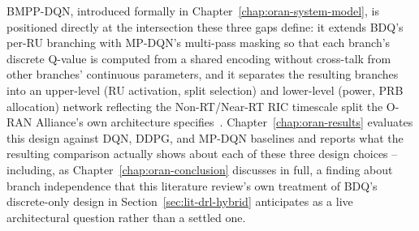 BMPP-DQN, introduced formally in Chapter~\ref{chap:oran-system-model},
is positioned directly at the intersection these three gaps define: it
extends BDQ's per-RU branching with MP-DQN's multi-pass masking so that each
branch's discrete Q-value is computed from a shared encoding without
cross-talk from other branches' continuous parameters, and it separates the
resulting branches into an upper-level (RU activation, split selection) and
lower-level (power, PRB allocation) network reflecting the Non-RT/Near-RT
RIC timescale split the O-RAN Alliance's own architecture
specifies~\cite{oran2021mvp}. Chapter~\ref{chap:oran-results} evaluates
this design against DQN, DDPG, and MP-DQN baselines and reports what the
resulting comparison actually shows about each of these three design
choices -- including, as Chapter~\ref{chap:oran-conclusion} discusses in
full, a finding about branch independence that this literature review's own
treatment of BDQ's discrete-only design in
Section~\ref{sec:lit-drl-hybrid} anticipates as a live architectural
question rather than a settled one.

